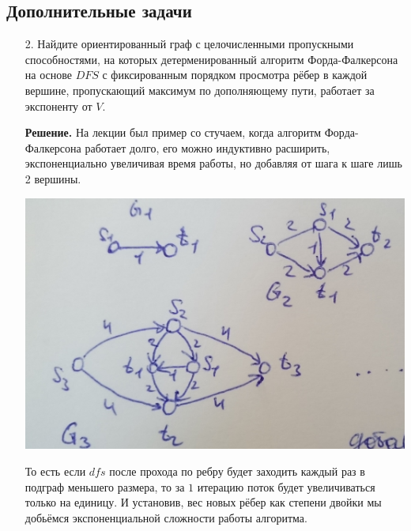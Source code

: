 \subsection*{Дополнительные задачи}
\begin{enumerate}
	\item[2.] Найдите ориентированный граф с целочисленными пропускными способностями, на которых детерменированный 
	алгоритм Форда-Фалкерсона на основе $DFS$ с фиксированным порядком просмотра рёбер в каждой вершине, 
	пропускающий максимум по дополняющему пути, работает за экспоненту от $V$.
	
	\textbf{Решение.} На лекции был пример со стучаем, когда алгоритм Форда-Фалкерсона работает долго, его можно 
	индуктивно расширить, экспоненциально увеличивая время работы, но добавляя от шага к шаге лишь 2 вершины.
	\begin{center}
		\includegraphics[scale=0.1]{ha/img/1.JPG}
	\end{center}
	То есть если $dfs$ после прохода по ребру будет заходить каждый раз в подграф меньшего размера, то за $1$ 
	итерацию поток будет увеличиваться только на единицу. И установив, вес новых рёбер как степени двойки мы 
	добьёмся экспоненциальной сложности работы алгоритма.
\end{enumerate}
